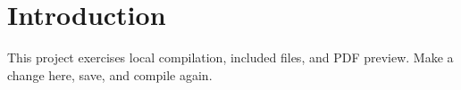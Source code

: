 \section{Introduction}
This project exercises local compilation, included files, and PDF preview.
Make a change here, save, and compile again.
